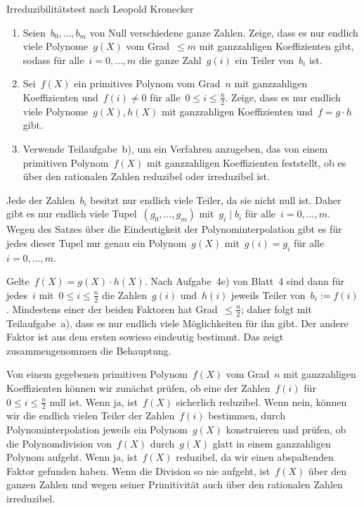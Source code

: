\documentclass{algblatt}
\begin{document}
\begin{aufgabe}{Irreduzibilitätstest nach Leopold Kronecker}
\begin{enumerate}
\item Seien~$b_0,\ldots,b_m$ von Null verschiedene ganze Zahlen. Zeige, dass es
nur endlich viele Polynome~$g(X)$ vom Grad~$\leq m$ mit ganzzahligen Koeffizienten
gibt, sodass für alle~$i = 0,\ldots,m$ die ganze Zahl~$g(i)$ ein Teiler
von~$b_i$ ist.
\item Sei~$f(X)$ ein primitives Polynom vom Grad~$n$ mit ganzzahligen
Koeffizienten und~$f(i) \neq 0$ für alle~$0 \leq i \leq \frac{n}{2}$. Zeige,
dass es nur endlich viele Polynome~$g(X), h(X)$ mit ganzzahligen Koeffizienten
und~$f = g \cdot h$ gibt.
\item Verwende Teilaufgabe~b), um ein Verfahren anzugeben, das von einem
primitiven Polynom~$f(X)$ mit ganzzahligen Koeffizienten feststellt, ob es
über den rationalen Zahlen reduzibel oder irreduzibel ist.
\end{enumerate}

\begin{loesungE}
\item Jede der Zahlen~$b_i$ besitzt nur endlich viele Teiler, da sie nicht null
ist. Daher gibt es nur endlich viele Tupel~$(g_0,\ldots,g_m)$ mit~$g_i \mid
b_i$ für alle~$i = 0,\ldots,m$. Wegen des Satzes über die Eindeutigkeit der
Polynominterpolation gibt es für jedes dieser Tupel nur genau ein Polynom~$g(X)$ mit~$g(i)
= g_i$ für alle~$i = 0,\ldots,m$.

\item Gelte~$f(X) = g(X) \cdot h(X)$.
Nach Aufgabe~4e) von Blatt~4 sind dann
für jedes~$i$ mit~$0 \leq i \leq \frac{n}{2}$ die Zahlen~$g(i)$ und~$h(i)$
jeweils Teiler von~$b_i := f(i)$. Mindestens einer der beiden Faktoren hat
Grad~$\leq \frac{n}{2}$; daher folgt mit Teilaufgabe~a), dass es nur endlich
viele Möglichkeiten für ihn gibt. Der andere Faktor ist aus dem ersten sowieso
eindeutig bestimmt. Das zeigt zusammengenommen die Behauptung.

\item Von einem gegebenen primitiven Polynom~$f(X)$ vom Grad~$n$ mit ganzzahligen
Koeffizienten können wir zunächst prüfen, ob eine der Zahlen~$f(i)$ für~$0 \leq i
\leq \frac{n}{2}$ null ist. Wenn ja, ist~$f(X)$ sicherlich reduzibel. Wenn
nein, können wir die endlich vielen Teiler der Zahlen~$f(i)$ bestimmen, durch
Polynominterpolation jeweils ein Polynom~$g(X)$ konstruieren und prüfen, ob die
Polynomdivision von~$f(X)$ durch~$g(X)$ glatt in einem ganzzahligen Polynom
aufgeht. Wenn ja, ist~$f(X)$ reduzibel, da wir einen abspaltenden Faktor
gefunden haben. Wenn die Division so nie aufgeht, ist~$f(X)$ über den ganzen
Zahlen und wegen seiner Primitivität auch über den rationalen Zahlen
irreduzibel.
\end{loesungE}
\end{aufgabe}
\end{document}
